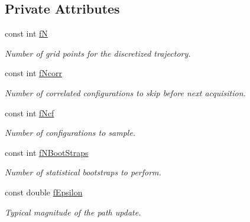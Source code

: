 \subsection*{Private Attributes}
\begin{DoxyCompactItemize}
\item 
\mbox{\label{classMetropolis_a015b0ab958c4e338d1cdaf19851297a5}} 
const int \hyperlink{classMetropolis_a015b0ab958c4e338d1cdaf19851297a5}{fN}
\begin{DoxyCompactList}\small\item\em Number of grid points for the discretized trajectory. \end{DoxyCompactList}\item 
\mbox{\label{classMetropolis_a631ff9cb571718a1b7db5ef9efdaff87}} 
const int \hyperlink{classMetropolis_a631ff9cb571718a1b7db5ef9efdaff87}{f\+Ncorr}
\begin{DoxyCompactList}\small\item\em Number of correlated configurations to skip before next acquisition. \end{DoxyCompactList}\item 
\mbox{\label{classMetropolis_a6607146aa35a49c876ee32b7523c2faf}} 
const int \hyperlink{classMetropolis_a6607146aa35a49c876ee32b7523c2faf}{f\+Ncf}
\begin{DoxyCompactList}\small\item\em Number of configurations to sample. \end{DoxyCompactList}\item 
\mbox{\label{classMetropolis_a3b599c6ae2343478cb6aaf9a6f579785}} 
const int \hyperlink{classMetropolis_a3b599c6ae2343478cb6aaf9a6f579785}{f\+N\+Boot\+Straps}
\begin{DoxyCompactList}\small\item\em Number of statistical bootstraps to perform. \end{DoxyCompactList}\item 
\mbox{\label{classMetropolis_aaf81aa8fa54ef1e96b9fce05081a4a9a}} 
const double \hyperlink{classMetropolis_aaf81aa8fa54ef1e96b9fce05081a4a9a}{f\+Epsilon}
\begin{DoxyCompactList}\small\item\em Typical magnitude of the path update. \end{DoxyCompactList}\item 

\end{DoxyCompactItemize}
